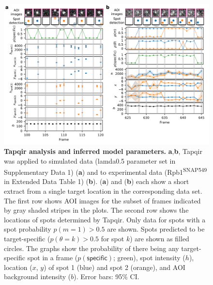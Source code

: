 \begin{figure}[ht]
\end{figure}

\begin{figure}[h]
\centering
\includegraphics[width=\textwidth]{figures/figure3/figure3.png}
\caption{\textbf{Tapqir analysis and inferred model parameters.} \textbf{a},\textbf{b}, Tapqir was applied to simulated data (lamda0.5 parameter set in Supplementary Data 1) (\textbf{a}) and to experimental data (Rpb1\textsuperscript{SNAP549} in Extended Data Table 1) (\textbf{b}). (\textbf{a}) and (\textbf{b}) each show a short extract from a single target location in the corresponding data set. The first row shows AOI images for the subset of frames indicated by gray shaded stripes in the plots. The second row shows the locations of spots determined by Tapqir. Only data for spots with a spot probability $p(m=1) > 0.5$ are shown. Spots predicted to be target-specific ($p(\theta=k)>0.5$ for spot $k$) are shown as filled circles. The graphs show the probability of there being any target-specific spot in a frame ($p(\mathsf{specific})$; green), spot intensity ($h$), location ($x$, $y$) of spot 1 (blue) and spot 2 (orange), and AOI background intensity ($b$). Error bars: 95\% CI.  }
\label{fig:tapqir_analysis}
\end{figure}

